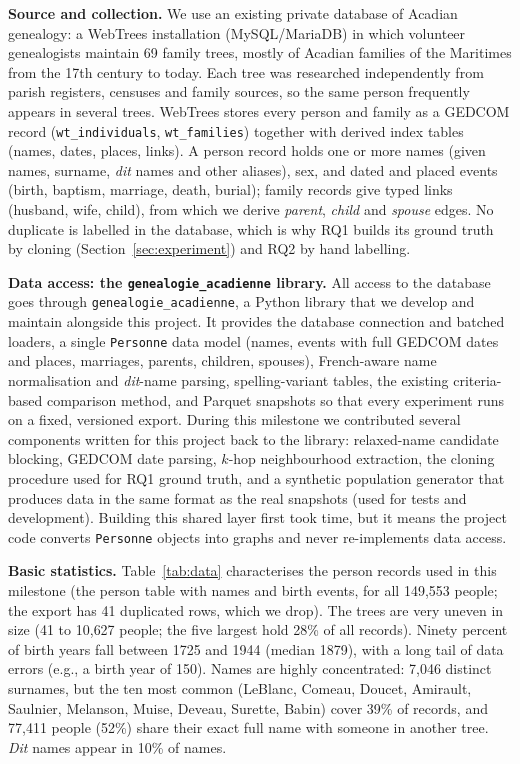 \textbf{Source and collection.}
We use an existing private database of Acadian genealogy: a WebTrees installation (MySQL/MariaDB) in which volunteer genealogists maintain 69 family trees, mostly of Acadian families of the Maritimes from the 17th century to today.
Each tree was researched independently from parish registers, censuses and family sources, so the same person frequently appears in several trees.
WebTrees stores every person and family as a GEDCOM record (\texttt{wt\_individuals}, \texttt{wt\_families}) together with derived index tables (names, dates, places, links).
A person record holds one or more names (given names, surname, \textit{dit} names and other aliases), sex, and dated and placed events (birth, baptism, marriage, death, burial); family records give typed links (husband, wife, child), from which we derive \textit{parent}, \textit{child} and \textit{spouse} edges.
No duplicate is labelled in the database, which is why RQ1 builds its ground truth by cloning (Section~\ref{sec:experiment}) and RQ2 by hand labelling.

\textbf{Data access: the \texttt{genealogie\_acadienne} library.}
All access to the database goes through \texttt{genealogie\_acadienne}, a Python library that we develop and maintain alongside this project.
It provides the database connection and batched loaders, a single \texttt{Personne} data model (names, events with full GEDCOM dates and places, marriages, parents, children, spouses), French-aware name normalisation and \textit{dit}-name parsing, spelling-variant tables, the existing criteria-based comparison method, and Parquet snapshots so that every experiment runs on a fixed, versioned export.
During this milestone we contributed several components written for this project back to the library: relaxed-name candidate blocking, GEDCOM date parsing, $k$-hop neighbourhood extraction, the cloning procedure used for RQ1 ground truth, and a synthetic population generator that produces data in the same format as the real snapshots (used for tests and development). Building this shared layer first took time, but it means the project code converts \texttt{Personne} objects into graphs and never re-implements data access.

\textbf{Basic statistics.}
Table~\ref{tab:data} characterises the person records used in this milestone (the person table with names and birth events, for all 149{,}553 people; the export has 41 duplicated rows, which we drop). The trees are very uneven in size (41 to 10{,}627 people; the five largest hold 28\% of all records).
Ninety percent of birth years fall between 1725 and 1944 (median 1879), with a long tail of data errors (e.g., a birth year of 150).
Names are highly concentrated: 7{,}046 distinct surnames, but the ten most common (LeBlanc, Comeau, Doucet, Amirault, Saulnier, Melanson, Muise, Deveau, Surette, Babin) cover 39\% of records, and 77{,}411 people (52\%) share their exact full name with someone in another tree.
\textit{Dit} names appear in 10\% of names.

